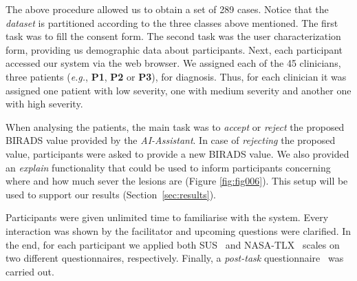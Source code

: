 The above procedure allowed us to obtain a set of 289 cases.
Notice that the {\it dataset} is partitioned according to the three classes above mentioned.
The first task was to fill the consent form.
The second task was the user characterization form, providing us demographic data about participants.
Next, each participant accessed our system via the web browser.
We assigned each of the 45 clinicians, three patients ({\it e.g.}, {\bf P1}, {\bf P2} or {\bf P3}), for diagnosis.
Thus, for each clinician it was assigned one patient with low severity, one with medium severity and another one with high severity.

When analysing the patients, the main task was to {\it accept} or {\it reject} the proposed BIRADS value provided by the {\it AI-Assistant}.
In case of {\it rejecting} the proposed value, participants were asked to provide a new BIRADS value.
We also provided an {\it explain} functionality that could be used to inform participants concerning where and how much sever the lesions are (Figure \ref{fig:fig006}).
This setup will be used to support our results (Section~\ref{sec:results}).

Participants were given unlimited time to familiarise with the system.
Every interaction was shown by the facilitator and upcoming questions were clarified.
In the end, for each participant we applied both SUS\footnotemark[6]~\cite{Tyllinen:2016:WNN:2858036.2858570} and NASA-TLX\footnotemark[7]~\cite{grier2015high, ramkumar2017using} scales on two different questionnaires, respectively.
Finally, a {\it post-task} questionnaire~\cite{https://doi.org/10.13140/rg.2.2.16566.14403/1} was carried out.



